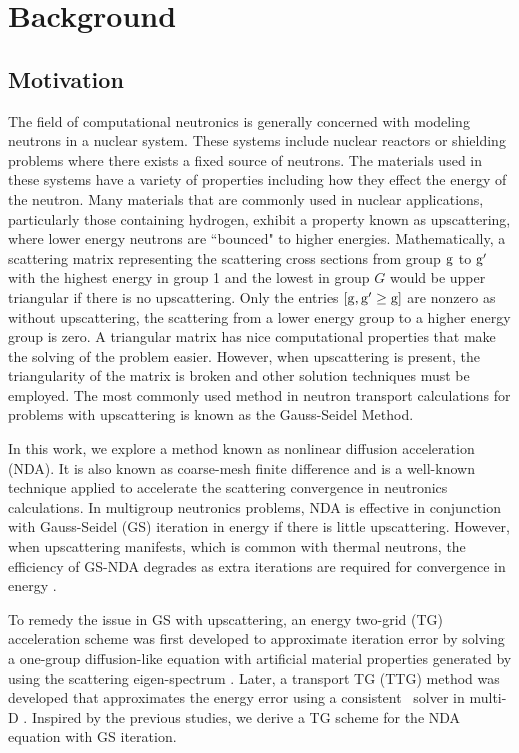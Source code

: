 \section{Background}
\subsection{Motivation}
The field of computational neutronics is generally concerned with modeling neutrons in a nuclear system. These systems include nuclear reactors or shielding problems where there exists a fixed source of neutrons. The materials used in these systems have a variety of properties including how they effect the energy of the neutron. Many materials that are commonly used in nuclear applications, particularly those containing hydrogen, exhibit a property known as upscattering, where lower energy neutrons are ``bounced" to higher energies. Mathematically, a scattering matrix representing the scattering cross sections from group $\mathrm{g}$ to $\mathrm{g}'$ with the highest energy in group 1 and the lowest in group $G$ would be upper triangular if there is no upscattering. Only the entries $[\mathrm{g}, \mathrm{g}'\geq \mathrm{g}]$ are nonzero as without upscattering, the scattering from a lower energy group to a higher energy group is zero. A triangular matrix has nice computational properties that make the solving of the problem easier. However, when upscattering is present, the triangularity of the matrix is broken and other solution techniques must be employed. The most commonly used method in neutron transport calculations for problems with upscattering is known as the Gauss-Seidel Method. 

In this work, we explore a method known as nonlinear diffusion acceleration (NDA). It is also known as coarse-mesh finite difference and is a well-known technique applied to accelerate the scattering convergence in neutronics calculations. In multigroup neutronics problems, NDA is effective in conjunction with Gauss-Seidel (GS) iteration in energy if there is little upscattering. However, when upscattering manifests, which is common with thermal neutrons, the efficiency of GS-NDA degrades as extra iterations are required for convergence in energy \cite{park-nda}.

To remedy the issue in GS with upscattering, an energy two-grid (TG) acceleration scheme was first developed to approximate iteration error by solving a one-group diffusion-like equation with artificial material properties generated by using the scattering eigen-spectrum \cite{morel-upscat}. Later, a transport TG (TTG) method was developed that approximates the energy error using a consistent \sn\ solver in multi-D \cite{evans-upscat}. Inspired by the previous studies, we derive a TG scheme for the NDA equation with GS iteration.


